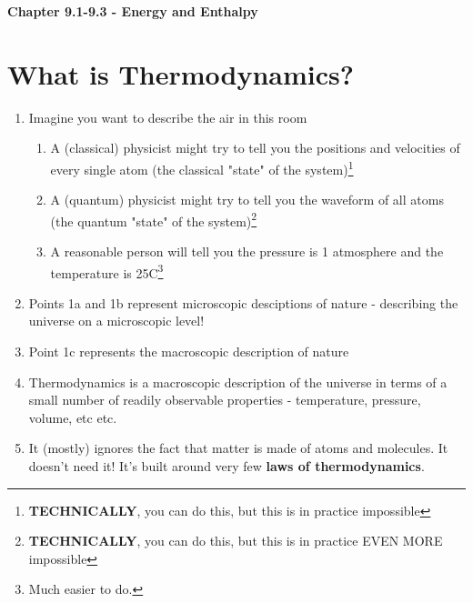 \documentclass{article}  %
\begin{document}
\newpage
\begin{center}
    \LARGE{\textbf{Chapter 9.1-9.3 - Energy and Enthalpy}}
\end{center}
\section*{What is Thermodynamics?}
\begin{enumerate}
    \item Imagine you want to describe the air in this room
    \begin{enumerate}
        \item A (classical) physicist might try to tell you the positions and velocities of every single atom (the classical "state" of the system)\footnote{\textbf{TECHNICALLY}, you can do this, but this is in practice impossible}
        \item A (quantum) physicist might try to tell you the waveform of all atoms (the quantum "state" of the system)\footnote{\textbf{TECHNICALLY}, you can do this, but this is in practice EVEN MORE impossible}
        \item A reasonable person will tell you the pressure is 1 atmosphere and the temperature is 25C\footnote{Much easier to do.}
    \end{enumerate}
    \item Points 1a and 1b represent microscopic desciptions of nature - describing the universe on a microscopic level!
    \item Point 1c represents the macroscopic description of nature
    \item Thermodynamics is a macroscopic description of the universe in terms of a small number of readily observable properties - temperature, pressure, volume, etc etc.
    \item It (mostly) ignores the fact that matter is made of atoms and molecules. It doesn't need it! It's built around very few \textbf{laws of thermodynamics}. 
\end{enumerate}
\end{document}
